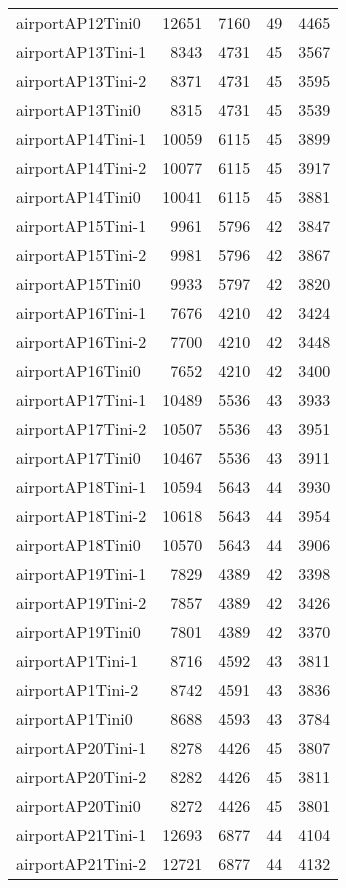 \begin{longtable}{lrrrr}
airportAP12Tini0 & 12651 & 7160 & 49 & 4465 \\
airportAP13Tini-1 & 8343 & 4731 & 45 & 3567 \\
airportAP13Tini-2 & 8371 & 4731 & 45 & 3595 \\
airportAP13Tini0 & 8315 & 4731 & 45 & 3539 \\
airportAP14Tini-1 & 10059 & 6115 & 45 & 3899 \\
airportAP14Tini-2 & 10077 & 6115 & 45 & 3917 \\
airportAP14Tini0 & 10041 & 6115 & 45 & 3881 \\
airportAP15Tini-1 & 9961 & 5796 & 42 & 3847 \\
airportAP15Tini-2 & 9981 & 5796 & 42 & 3867 \\
airportAP15Tini0 & 9933 & 5797 & 42 & 3820 \\
airportAP16Tini-1 & 7676 & 4210 & 42 & 3424 \\
airportAP16Tini-2 & 7700 & 4210 & 42 & 3448 \\
airportAP16Tini0 & 7652 & 4210 & 42 & 3400 \\
airportAP17Tini-1 & 10489 & 5536 & 43 & 3933 \\
airportAP17Tini-2 & 10507 & 5536 & 43 & 3951 \\
airportAP17Tini0 & 10467 & 5536 & 43 & 3911 \\
airportAP18Tini-1 & 10594 & 5643 & 44 & 3930 \\
airportAP18Tini-2 & 10618 & 5643 & 44 & 3954 \\
airportAP18Tini0 & 10570 & 5643 & 44 & 3906 \\
airportAP19Tini-1 & 7829 & 4389 & 42 & 3398 \\
airportAP19Tini-2 & 7857 & 4389 & 42 & 3426 \\
airportAP19Tini0 & 7801 & 4389 & 42 & 3370 \\
airportAP1Tini-1 & 8716 & 4592 & 43 & 3811 \\
airportAP1Tini-2 & 8742 & 4591 & 43 & 3836 \\
airportAP1Tini0 & 8688 & 4593 & 43 & 3784 \\
airportAP20Tini-1 & 8278 & 4426 & 45 & 3807 \\
airportAP20Tini-2 & 8282 & 4426 & 45 & 3811 \\
airportAP20Tini0 & 8272 & 4426 & 45 & 3801 \\
airportAP21Tini-1 & 12693 & 6877 & 44 & 4104 \\
airportAP21Tini-2 & 12721 & 6877 & 44 & 4132 \\

\end{longtable}
